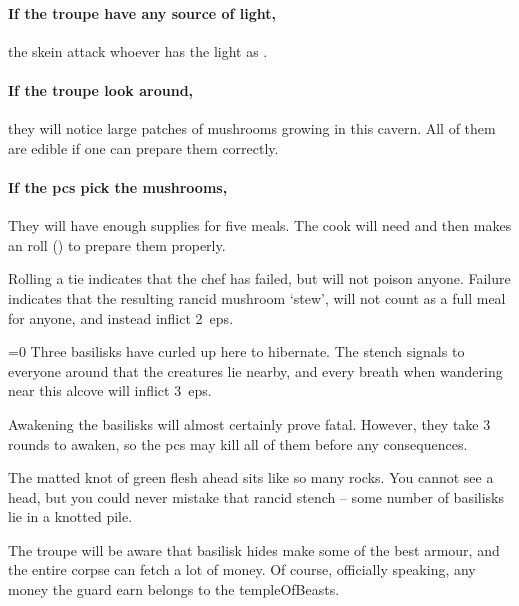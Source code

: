 \begin{multicols}{2}
\paragraph{If the troupe have any source of light,}
the skein attack whoever has the light as .

\skeinSwarm

\paragraph{If the troupe look around,}
they will notice large patches of mushrooms growing in this cavern.
All of them are edible if one can prepare them correctly.

\paragraph{If the \glspl{pc} pick the mushrooms,}
They will have enough supplies for five meals.
The cook will need  and then makes an  roll (\tn[10]) to prepare them properly.

Rolling a tie indicates that the chef has failed, but will not poison anyone.
Failure indicates that the resulting rancid mushroom `stew', will not count as a full meal for anyone, and instead inflict 2~\glspl{ep}.



\ifnum\value{temperature}=0
  Three \glspl{basilisk} have curled up here to hibernate.
  The stench signals to everyone around that the creatures lie nearby, and every breath when wandering near this alcove will inflict 3~\glspl{ep}.

  Awakening the \glspl{basilisk} will almost certainly prove fatal.
  However, they take 3 rounds to awaken, so the \glspl{pc} may kill all of them before any consequences.

  \begin{boxtext}
    The matted knot of green flesh ahead sits like so many rocks.
    You cannot see a head, but you could never mistake that rancid stench -- some number of \glspl{basilisk} lie in a knotted pile.
  \end{boxtext}

  The troupe will be aware that \gls{basilisk} hides make some of the best armour, and the entire corpse can fetch a lot of money.
  Of course, officially speaking, any money the \gls{guard} earn belongs to the \gls{templeOfBeasts}.


\end{multicols}
